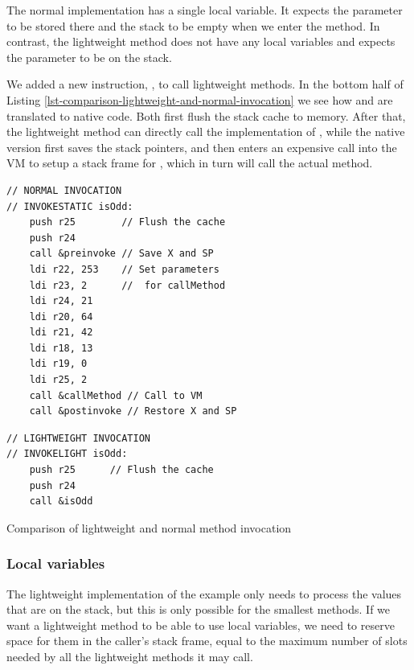 The normal implementation has a single local variable. It expects the parameter to be stored there and the stack to be empty when we enter the method. In contrast, the lightweight method does not have any local variables and expects the parameter to be on the stack.

We added a new instruction, , to call lightweight methods. In the bottom half of Listing \ref{lst-comparison-lightweight-and-normal-invocation} we see how  and  are translated to native code. Both first flush the stack cache to memory. After that, the lightweight method can directly call the implementation of , while the native version first saves the stack pointers, and then enters an expensive call into the VM to setup a stack frame for , which in turn will call the actual method.

\begin{listing}
\centering
\begin{minipage}[t]{0.5\textwidth}
\centering
\begin{verbatim}
// NORMAL INVOCATION
// INVOKESTATIC isOdd:
    push r25        // Flush the cache
    push r24
    call &preinvoke // Save X and SP
    ldi r22, 253    // Set parameters
    ldi r23, 2      //  for callMethod
    ldi r24, 21
    ldi r20, 64
    ldi r21, 42
    ldi r18, 13
    ldi r19, 0
    ldi r25, 2
    call &callMethod // Call to VM
    call &postinvoke // Restore X and SP
\end{verbatim}
\end{minipage}\hfill
\begin{minipage}[t]{0.45\textwidth}
\centering
\begin{verbatim}
// LIGHTWEIGHT INVOCATION
// INVOKELIGHT isOdd:
    push r25      // Flush the cache
    push r24
    call &isOdd
\end{verbatim}
\end{minipage}
\caption{Comparison of lightweight and normal method invocation}
\label{lst-comparison-lightweight-and-normal-invocation}
\end{listing}

\subsubsection{Local variables}
The lightweight implementation of the  example only needs to process the values that are on the stack, but this is only possible for the smallest methods. If we want a lightweight method to be able to use local variables, we need to reserve space for them in the caller's stack frame, equal to the maximum number of slots needed by all the lightweight methods it may call.

